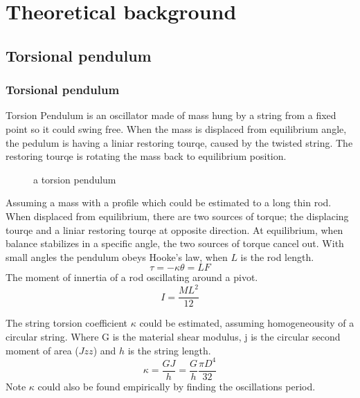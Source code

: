 \documentclass[\main/master.tex]{subfiles}
\begin{document}
\chapter{Theoretical background}\label{chp:example-2}


\section{Torsional pendulum}
\subsection{Torsional pendulum}
Torsion Pendulum is an oscillator made of mass hung by a string from a fixed point so it could swing free. When the mass is displaced from equilibrium angle, the pedulum is having a liniar restoring tourqe, caused by the twisted string. The restoring tourqe is rotating the mass back to equilibrium position.


\begin{figure}[htbp]
	\centering
	\caption[pendulum]{a torsion pendulum}
	\label{fig:torsion_pendulum}
\end{figure}

Assuming a mass with a profile which could be estimated to a long thin rod. When displaced from equilibrium, there are two sources of torque; the displacing tourqe and a liniar restoring tourqe at opposite direction. At equilibrium, when balance stabilizes in a specific angle, the two sources of torque cancel out. With small angles the pendulum obeys Hooke’s law, when $L$ is the rod length.
\begin{equation}
\tau = -\kappa\theta = LF    \label{eqn:Hooke_law}
\end{equation}
The moment of innertia of a rod oscillating around a pivot.
\begin{equation}
I = \frac{ML^2}{12}     \label{eqn:moment_innertia}
\end{equation}  


The string torsion coefficient $\kappa $ could be estimated, assuming homogeneousity of a circular string. Where G is the material shear modulus, j is the circular second moment of area ($Jzz$) and $h$ is the string length.
\begin{equation}
\kappa = \frac{GJ}{h} = \frac{G}{h} \frac{\pi D^4}{32}    \label{eqn:torsion_coefficient}
\end{equation}
Note  $\kappa$ could also be found empirically by finding  the  oscillations period.
 
\end{document}

